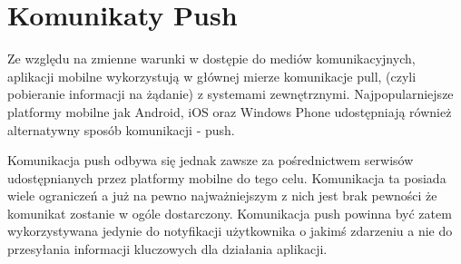 \section{Komunikaty Push}
\label{sec:push}

Ze względu na zmienne warunki w dostępie do mediów komunikacyjnych, aplikacji mobilne wykorzystują w głównej mierze komunikacje pull, (czyli pobieranie informacji na żądanie) z systemami zewnętrznymi. Najpopularniejsze platformy mobilne jak Android, iOS oraz Windows Phone udostępniają również alternatywny sposób komunikacji - push. 

Komunikacja push odbywa się jednak zawsze za pośrednictwem serwisów udostępnianych przez platformy mobilne do tego celu. Komunikacja ta posiada wiele ograniczeń a już na pewno najważniejszym z nich jest brak pewności że komunikat zostanie w ogóle dostarczony. Komunikacja push powinna być zatem wykorzystywana jedynie do notyfikacji użytkownika o jakimś zdarzeniu a nie do przesyłania informacji kluczowych dla działania aplikacji. 
